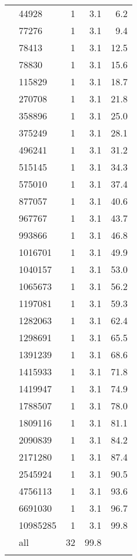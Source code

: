 \documentclass{article}
\begin{document}
\begin{longtable}{llrrr}
   & 44928 & 1 & 3.1 & 6.2 \\ 
   & 77276 & 1 & 3.1 & 9.4 \\ 
   & 78413 & 1 & 3.1 & 12.5 \\ 
   & 78830 & 1 & 3.1 & 15.6 \\ 
   & 115829 & 1 & 3.1 & 18.7 \\ 
   & 270708 & 1 & 3.1 & 21.8 \\ 
   & 358896 & 1 & 3.1 & 25.0 \\ 
   & 375249 & 1 & 3.1 & 28.1 \\ 
   & 496241 & 1 & 3.1 & 31.2 \\ 
   & 515145 & 1 & 3.1 & 34.3 \\ 
   & 575010 & 1 & 3.1 & 37.4 \\ 
   & 877057 & 1 & 3.1 & 40.6 \\ 
   & 967767 & 1 & 3.1 & 43.7 \\ 
   & 993866 & 1 & 3.1 & 46.8 \\ 
   & 1016701 & 1 & 3.1 & 49.9 \\ 
   & 1040157 & 1 & 3.1 & 53.0 \\ 
   & 1065673 & 1 & 3.1 & 56.2 \\ 
   & 1197081 & 1 & 3.1 & 59.3 \\ 
   & 1282063 & 1 & 3.1 & 62.4 \\ 
   & 1298691 & 1 & 3.1 & 65.5 \\ 
   & 1391239 & 1 & 3.1 & 68.6 \\ 
   & 1415933 & 1 & 3.1 & 71.8 \\ 
   & 1419947 & 1 & 3.1 & 74.9 \\ 
   & 1788507 & 1 & 3.1 & 78.0 \\ 
   & 1809116 & 1 & 3.1 & 81.1 \\ 
   & 2090839 & 1 & 3.1 & 84.2 \\ 
   & 2171280 & 1 & 3.1 & 87.4 \\ 
   & 2545924 & 1 & 3.1 & 90.5 \\ 
   & 4756113 & 1 & 3.1 & 93.6 \\ 
   & 6691030 & 1 & 3.1 & 96.7 \\ 
   & 10985285 & 1 & 3.1 & 99.8 \\ 
   \hline
 & all & 32 & 99.8 &  \\ 
   \hline
\hline
\hline
\label{Tfrecuencias}
\end{longtable}
\endgroup
\end{document}
